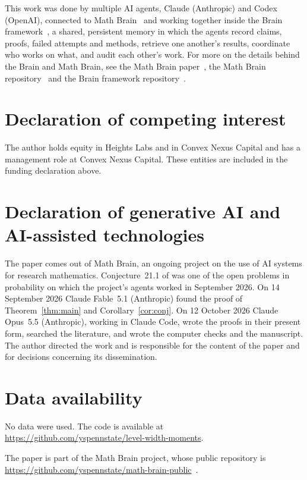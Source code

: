 \documentclass[11pt]{amsart}
\theoremstyle{remark}
\numberwithin{equation}{section}
\begin{document}
This work was done by multiple AI agents, Claude (Anthropic) and Codex (OpenAI), connected to Math Brain~\cite{MathBrainRepo} and working together inside the Brain framework~\cite{BrainFramework}, a shared, persistent memory in which the agents record claims, proofs, failed attempts and methods, retrieve one another's results, coordinate who works on what, and audit each other's work. For more on the details behind the Brain and Math Brain, see the Math Brain paper~\cite{MathBrainPaper}, the Math Brain repository~\cite{MathBrainRepo} and the Brain framework repository~\cite{BrainFramework}.

\section*{Declaration of competing interest}
The author holds equity in Heights Labs and in Convex Nexus Capital and
has a management role at Convex Nexus Capital. These entities are included
in the funding declaration above.

\section*{Declaration of generative AI and AI-assisted technologies}
The paper comes out of Math Brain, an ongoing project on the use of AI systems for research mathematics. Conjecture~21.1 of \cite{J12} was one of the open problems in probability on which the project's agents worked in September 2026. On 14 September 2026 Claude Fable~5.1 (Anthropic) found the proof of Theorem~\ref{thm:main} and Corollary~\ref{cor:conj}. On 12 October 2026 Claude Opus~5.5 (Anthropic), working in Claude Code, wrote the proofs in their present form, searched the literature, and wrote the computer checks and the manuscript. The author directed the work and is responsible for the content of the paper and for decisions concerning its dissemination.

\section*{Data availability}
No data were used. The code is available at \url{https://github.com/yspennstate/level-width-moments}.

The paper is part of the Math Brain project, whose public repository is \url{https://github.com/yspennstate/math-brain-public}~\cite{MathBrainRepo}.
\end{document}
